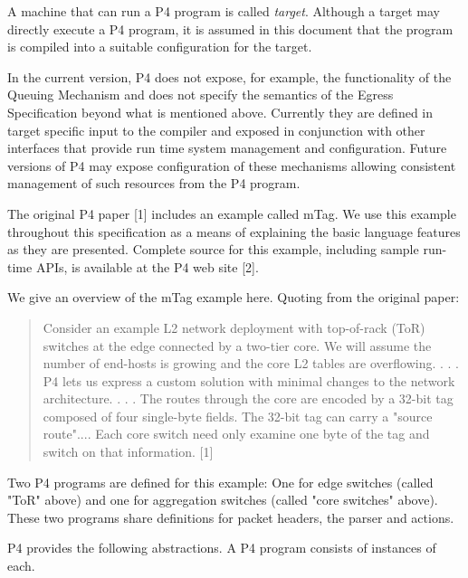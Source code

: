 \documentclass[12pt]{article}
\begin{document}
A machine that can run a P4 program is called \textit{target}. Although a target 
may directly execute a P4 program, it is assumed in this document that the 
program is compiled into a suitable configuration for the target.

In the current version, P4 does not expose, for example, the functionality 
of the Queuing Mechanism and does not specify the semantics of the Egress 
Specification beyond what is mentioned above. Currently they are defined in 
target specific input to the compiler and exposed in conjunction with other 
interfaces that provide run time system management and configuration. Future 
versions of P4 may expose configuration of these mechanisms allowing consistent 
management of such resources from the P4 program.


The original P4 paper [1] includes an example called mTag. We use this example 
throughout this specification as a means of explaining the basic language 
features as they are presented. Complete source for this example, including 
sample run-time APIs, is available at the P4 web site [2].

We give an overview of the mTag example here.  Quoting from the original paper:

\begin{quote}
Consider an example L2 network deployment with top-of-rack (ToR) switches 
at the edge connected by a two-tier core. We will assume the number of end-hosts 
is growing and the core L2 tables are overflowing. . . .  P4 lets us express a 
custom solution with minimal changes to the network architecture. . . . The routes 
through the core are encoded by a 32-bit tag composed of four single-byte 
fields.  The 32-bit tag can carry a "source route".... Each core switch need 
only examine one byte of the tag and switch on that information. [1]
\end{quote}

Two P4 programs are defined for this example: One for edge switches (called 
"ToR" above) and one for aggregation switches (called "core switches" above). 
These two programs share definitions for packet headers, the parser and actions.


P4 provides the following abstractions. A P4 program consists of instances 
of each.
\end{document}
